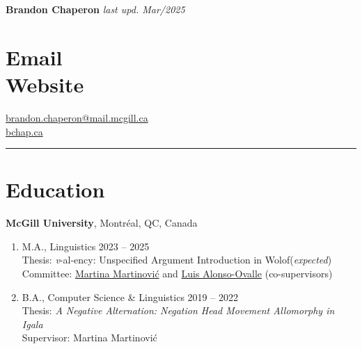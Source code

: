 \documentclass[margin,line]{resume}
\begin{document}
{\Large \textbf{Brandon Chaperon} \hfill\footnotesize {\it last upd. Mar/2025} \hphantom{.............................}}
\begin{resume}


	\section{\mysidestyle Email \vspace{0.3em}\\Website}
	\href{mailto:brandon.chaperon@mail.mcgill.ca}{brandon.chaperon@mail.mcgill.ca}\vspace{0.3em}\\
	\href{https://bchaper0n.github.io/}{bchap.ca}



	\vspace{-1em}\rule{\columnwidth}{0.4pt}


	\vspace{-0.7em}

	\section{\mysidestyle Education}

	\textbf{McGill University}, Montr\'{e}al, QC, Canada
	\begin{enumerate}[-, leftmargin=1em, topsep=2pt]
		\item[] M.A., %
		      Linguistics%
		      \hfill 2023 -- 2025 \\
			  {\small Thesis: {\it v}-al-ency: Unspecified Argument Introduction in Wolof\hfill (\textit{expected})\\
			  Committee: \href{https://inamartinovic.com/}{Martina Martinović} and \href{https://people.linguistics.mcgill.ca/~luis.alonso-ovalle/}{Luis Alonso-Ovalle} (co-supervisors)}\vspace{0.2em}
		\item[] B.A., %
		      Computer Science %
		      \& %
		      Linguistics%
		      \hfill 2019 -- 2022\\
			  {\small Thesis: {\it A Negative Alternation: Negation Head Movement Allomorphy in Igala}\\
			  Supervisor: Martina Martinović}
	\end{enumerate}


\end{resume}
\end{document}
